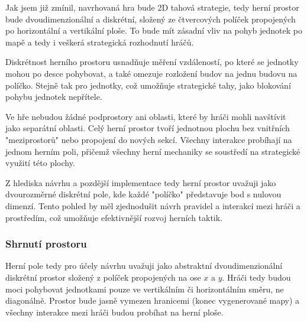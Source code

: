 Jak jsem již zmínil, navrhovaná hra bude 2D tahová strategie, tedy herní prostor bude dvoudimenzionální a diskrétní, složený ze čtvercových políček propojených po horizontální a vertikální ploše. To bude mít zásadní vliv na pohyb jednotek po mapě a tedy i veškerá strategická rozhodnutí hráčů.

Diskrétnost herního prostoru usnadňuje měření vzdáleností, po které se jednotky mohou po desce pohybovat, a také omezuje rozložení budov na jednu budovu na políčko. Stejně tak pro jednotky, což umožňuje strategické tahy, jako blokování pohybu jednotek nepřítele.

Ve hře nebudou žádné podprostory ani oblasti, které by hráči mohli navštívit jako separátní oblasti. Celý herní prostor tvoří jednotnou plochu bez vnitřních "meziprostorů" nebo propojení do nových sekcí. Všechny interakce probíhají na jednom herním poli, přičemž všechny herní mechaniky se soustředí na strategické využití této plochy.

Z hlediska návrhu a pozdější implementace tedy herní prostor uvažuji jako dvourozměrné diskrétní pole, kde každé "políčko" představuje bod s nulovou dimenzí. Tento pohled by měl zjednodušit návrh pravidel a interakcí mezi hráči a prostředím, což umožňuje efektivnější rozvoj herních taktik.

\subsubsection{Shrnutí prostoru}

Herní pole tedy pro účely návrhu uvažuji jako abstraktní dvoudimenzionální diskrétní prostor složený z políček propojených na ose $x$ a $y$. Hráči tedy budou moci pohybovat jednotkami pouze ve vertikálním či horizontálním směru, ne diagonálně. Prostor bude jasně vymezen hranicemi (konec vygenerované mapy) a všechny interakce mezi hráči budou probíhat na herní ploše. 


